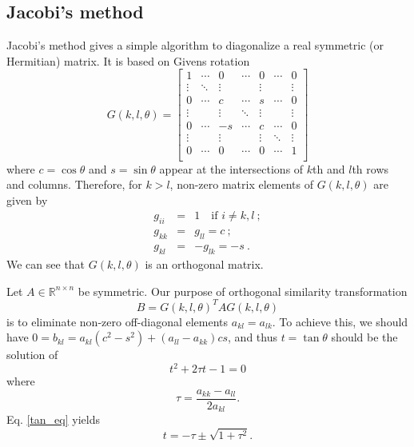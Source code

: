 \documentclass{article}
\begin{document}
	\subsection{Jacobi's method}
Jacobi's method gives a simple algorithm to diagonalize a real symmetric (or Hermitian) matrix. 
It is based on Givens rotation 
\begin{equation}\label{Givens}
G(k,l,\theta)=
\begin{bmatrix}
1  &  \cdots  & 0 & \cdots & 0 & \cdots & 0 \\
\vdots  & \ddots  & \vdots & & \vdots &  & \vdots \\
0  & \cdots & c  & \cdots & s & \cdots & 0  \\
\vdots &  & \vdots & \ddots & \vdots &  &\vdots \\
0 & \cdots & -s & \cdots & c & \cdots & 0 \\
\vdots &  & \vdots & & \vdots & \ddots & \vdots \\
0 & \cdots & 0 & \cdots & 0 & \cdots & 1 \\ 
\end{bmatrix}
\end{equation}
where $c=\cos\theta$ and $s=\sin\theta$ appear at the intersections of $k$th and $l$th rows and columns. 
Therefore, for $k>l$, non-zero matrix elements of $G(k,l,\theta)$ are given by 
\begin{eqnarray*}
g_{ii}&=&1 \quad \text{if } i\neq k,l\ ; \\
g_{kk}&=&g_{ll}=c\ ; \\
g_{kl}&=&-g_{lk}=-s\ . 
\end{eqnarray*}
We can see that $G(k,l,\theta)$ is an orthogonal matrix. 
\par
Let $A\in \mathbb{R}^{n \times n}$ be symmetric. Our purpose of orthogonal similarity transformation 
\begin{equation}\label{GivensSimilarity}
B=G(k,l,\theta)^{T}AG(k,l,\theta)
\end{equation}
is to eliminate non-zero off-diagonal elements $a_{kl}=a_{lk}$. 
To achieve this, we should have $0=b_{kl}=a_{kl}(c^2-s^2)+(a_{ll}-a_{kk})cs$, 
and thus $t=\tan\theta$ should be the solution of 
\begin{equation}\label{tan_eq}
t^2+2\tau t -1 = 0
\end{equation}
where
\begin{equation}
\tau=\frac{a_{kk}-a_{ll}}{2a_{kl}}. 
\end{equation}
Eq. \ref{tan_eq} yields 
\begin{equation}\label{root}
t=-\tau\pm\sqrt{1+\tau^2}.
\end{equation}
\end{document}
